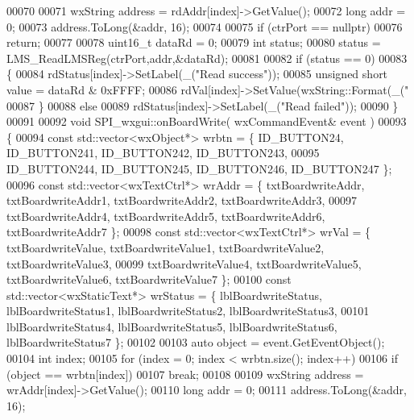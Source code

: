 \begin{DoxyCode}
00070     
00071     wxString address = rdAddr[index]->GetValue();
00072     \textcolor{keywordtype}{long} addr = 0;
00073     address.ToLong(&addr, 16);
00074 
00075     \textcolor{keywordflow}{if} (ctrPort == \textcolor{keyword}{nullptr})
00076         \textcolor{keywordflow}{return};
00077 
00078     uint16\_t dataRd = 0;
00079     \textcolor{keywordtype}{int} status;
00080     status = LMS_ReadLMSReg(ctrPort,addr,&dataRd);
00081 
00082     \textcolor{keywordflow}{if} (status == 0)
00083     \{
00084         rdStatus[index]->SetLabel(\_(\textcolor{stringliteral}{"Read success"}));
00085         \textcolor{keywordtype}{unsigned} \textcolor{keywordtype}{short} value = dataRd & 0xFFFF;
00086         rdVal[index]->SetValue(wxString::Format(\_(\textcolor{stringliteral}{"%
00087     \}
00088     \textcolor{keywordflow}{else}
00089         rdStatus[index]->SetLabel(\_(\textcolor{stringliteral}{"Read failed"}));
00090 \}
00091 
00092 \textcolor{keywordtype}{void} SPI_wxgui::onBoardWrite( wxCommandEvent& event )
00093 \{
00094     \textcolor{keyword}{const} std::vector<wxObject*> wrbtn = \{ ID_BUTTON24, ID_BUTTON241, 
      ID_BUTTON242, ID_BUTTON243,
00095         ID_BUTTON244, ID_BUTTON245, ID_BUTTON246, ID_BUTTON247 \};
00096     \textcolor{keyword}{const} std::vector<wxTextCtrl*> wrAddr = \{ txtBoardwriteAddr, 
      txtBoardwriteAddr1, txtBoardwriteAddr2, txtBoardwriteAddr3,
00097         txtBoardwriteAddr4, txtBoardwriteAddr5, txtBoardwriteAddr6, 
      txtBoardwriteAddr7 \};
00098     \textcolor{keyword}{const} std::vector<wxTextCtrl*> wrVal = \{ txtBoardwriteValue, 
      txtBoardwriteValue1, txtBoardwriteValue2, txtBoardwriteValue3,
00099         txtBoardwriteValue4, txtBoardwriteValue5, txtBoardwriteValue6, 
      txtBoardwriteValue7 \};
00100     \textcolor{keyword}{const} std::vector<wxStaticText*> wrStatus = \{ lblBoardwriteStatus, 
      lblBoardwriteStatus1, lblBoardwriteStatus2, lblBoardwriteStatus3,
00101         lblBoardwriteStatus4, lblBoardwriteStatus5, lblBoardwriteStatus6, 
      lblBoardwriteStatus7 \};
00102 
00103     \textcolor{keyword}{auto} \textcolor{keywordtype}{object} = \textcolor{keyword}{event}.GetEventObject();
00104     \textcolor{keywordtype}{int} index;
00105     \textcolor{keywordflow}{for} (index = 0; index < wrbtn.size(); index++)
00106         \textcolor{keywordflow}{if} (\textcolor{keywordtype}{object} == wrbtn[index])
00107             \textcolor{keywordflow}{break};
00108 
00109     wxString address = wrAddr[index]->GetValue();
00110     \textcolor{keywordtype}{long} addr = 0;
00111     address.ToLong(&addr, 16);
}
\end{DoxyCode}
